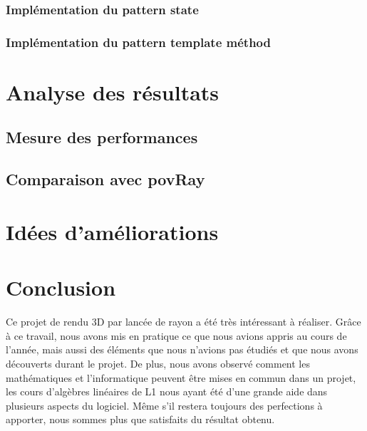 \documentclass[11pt]{article}
\begin{document}
        \subsubsection{Implémentation du pattern state}
        	
        \subsubsection{Implémentation du pattern template méthod}
        	




\section{Analyse des résultats}
    \subsection{Mesure des performances}
        

    \subsection{Comparaison avec povRay}
\section{Idées d'améliorations}
    
\section{Conclusion}

    Ce projet de rendu 3D par lancée de rayon a été très intéressant à réaliser.
    Grâce à ce travail, nous avons mis en pratique ce que nous avions appris au cours de l'année, mais aussi des éléments que nous n'avions pas étudiés et que nous avons découverts durant le projet.
    De plus, nous avons observé comment les mathématiques et l'informatique peuvent être mises en commun dans un projet, les cours d'algèbres linéaires de L1 nous ayant été d'une grande aide dans plusieurs aspects du logiciel.
    Même s'il restera toujours des perfections à apporter, nous sommes plus que satisfaits du résultat obtenu.




\newpage%


\newpage%
\nocite{*}


\end{document}
